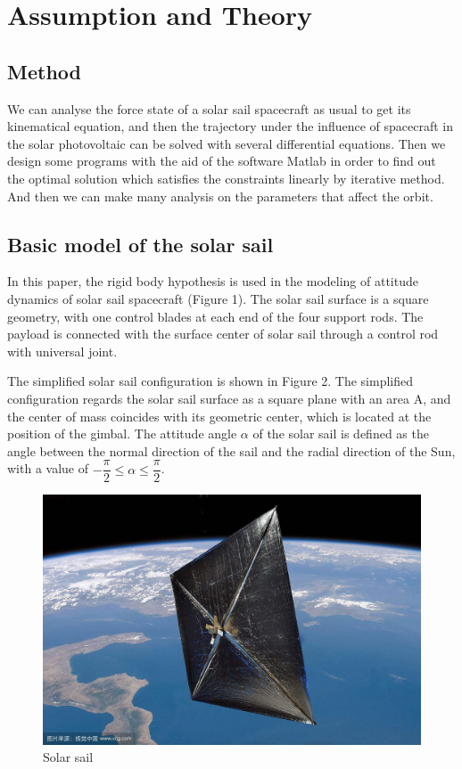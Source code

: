 \documentclass[../Paper.tex]{subfiles}
\begin{document}
\section{Assumption and Theory}

\subsection{Method}

We can analyse the force state of a solar sail spacecraft as usual to get its kinematical equation, and then the trajectory under the influence of spacecraft in the solar photovoltaic can be solved with several differential equations. Then we design some programs with the aid of the software Matlab in order to find out the optimal solution which satisfies the constraints linearly by iterative method. And then we can make many analysis on the parameters that affect the orbit.

\subsection{Basic model of the solar sail}

In this paper, the rigid body hypothesis is used in the modeling of attitude dynamics of solar sail spacecraft (Figure 1). The solar sail surface is a square geometry, with one control blades at each end of the four support rods. The payload is connected with the surface center of solar sail through a control rod with universal joint.

The simplified solar sail configuration is shown in Figure 2. The simplified configuration regards the solar sail surface as a square plane with an area A, and the center of mass coincides with its geometric center, which is located at the position of the gimbal. The attitude angle $\alpha$ of the solar sail is defined as the angle between the normal direction of the sail and the radial direction of the Sun, with a value of $-\dfrac{\pi}{2}\leq\alpha\leq\dfrac{\pi}{2}$. 

\begin{figure}[H]
 \centering
 \includegraphics[scale=0.2]{../Figures/solarsailmodel.jpg}
 \caption{Solar sail}
\end{figure}
\end{document}
